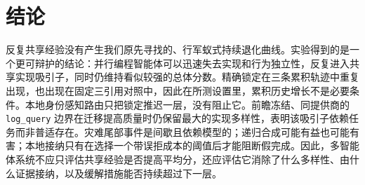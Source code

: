 \documentclass[UTF8,letterpaper,10pt,twocolumn]{ctexart}
\begin{document}
\section{结论}

反复共享经验没有产生我们原先寻找的、行军蚁式持续退化曲线。实验得到的是一个更可辩护的结论：并行编程智能体可以迅速失去实现和行为独立性，反复进入共享实现吸引子，同时仍维持看似较强的总体分数。精确锁定在三条累积轨迹中重复出现，也出现在固定三引用对照中，因此在所测设置里，累积历史增长不是必要条件。本地身份感知路由只把锁定推迟一层，没有阻止它。前瞻冻结、同提供商的 \texttt{log\_query} 边界在迁移提高质量时仍保留最大的实现多样性，表明该吸引子依赖任务而非普适存在。灾难尾部事件是间歇且依赖模型的；递归合成可能有益也可能有害；本地接纳只有在选择一个带误拒成本的阈值后才能阻断假完成。因此，多智能体系统不应只评估共享经验是否提高平均分，还应评估它消除了什么多样性、由什么证据接纳，以及缓解措施能否持续超过下一层。



\end{document}

